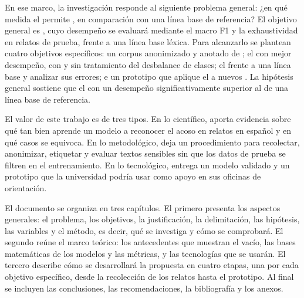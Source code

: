 En ese marco, la investigación responde al siguiente problema general: ¿en qué medida el   permite , en comparación con una línea base de referencia? El objetivo general es   , cuyo desempeño se evaluará mediante el macro F1 y la exhaustividad en relatos de prueba, frente a una línea base léxica. Para alcanzarlo se plantean cuatro objetivos específicos:  un corpus anonimizado y anotado de ;  el  con mejor desempeño, con y sin tratamiento del desbalance de clases;  el  frente a una línea base y analizar sus errores; e  un prototipo que aplique el  a nuevos . La hipótesis general sostiene que el    con un desempeño significativamente superior al de una línea base de referencia.

El valor de este trabajo es de tres tipos. En lo científico, aporta evidencia sobre qué tan bien aprende un modelo a reconocer el acoso en relatos en español y en qué casos se equivoca. En lo metodológico, deja un procedimiento para recolectar, anonimizar, etiquetar y evaluar textos sensibles sin que los datos de prueba se filtren en el entrenamiento. En lo tecnológico, entrega un modelo validado y un prototipo que la universidad podría usar como apoyo en sus oficinas de orientación.

El documento se organiza en tres capítulos. El primero presenta los aspectos generales: el problema, los objetivos, la justificación, la delimitación, las hipótesis, las variables y el método, es decir, qué se investiga y cómo se comprobará. El segundo reúne el marco teórico: los antecedentes que muestran el vacío, las bases matemáticas de los modelos y las métricas, y las tecnologías que se usarán. El tercero describe cómo se desarrollará la propuesta en cuatro etapas, una por cada objetivo específico, desde la recolección de los relatos hasta el prototipo. Al final se incluyen las conclusiones, las recomendaciones, la bibliografía y los anexos.
